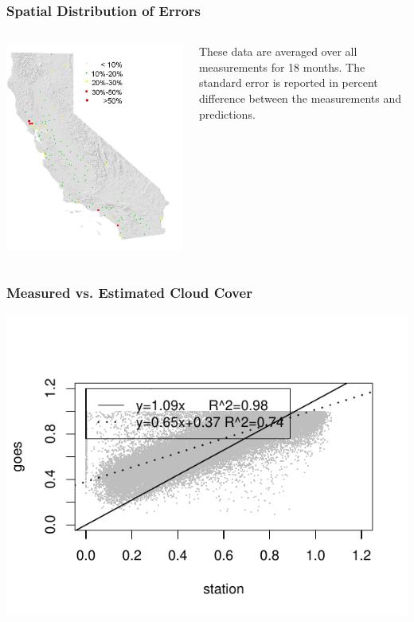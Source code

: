 \documentclass{beamer}
\begin{document}
\begin{frame}
  \frametitle{Spatial Distribution of Errors}
  \begin{columns}
    \includegraphics[height=0.8\textheight]{sr}
    \begin{block}{}
      These data are averaged over all measurements for 18
      months.  The standard error is reported in percent difference
      between the measurements and predictions.    
    \end{block}
  \end{columns}
\end{frame}

\begin{frame}
  \frametitle{Measured vs. Estimated Cloud Cover}
  \includegraphics{K_R.pdf}
\end{frame}
\end{document}
